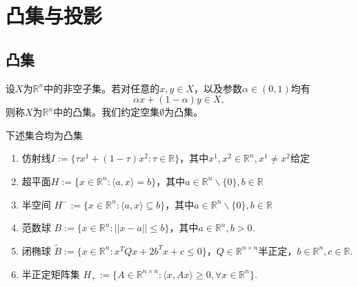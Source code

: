 \chapter{凸集与投影}\label{chap:convexSet}
\section{凸集}
\begin{definition}[凸集]
    设$X$为$\mathbb{R}^n$中的非空子集。若对任意的$x,y\in X$，以及参数$\alpha\in(0,1)$均有
    \begin{equation}\label{eq:convexSetDefinition}
        \alpha x + (1-\alpha)y\in X,
    \end{equation}
    则称$X$为$\mathbb{R}^n$中的凸集。我们约定空集$\emptyset$为凸集。
\end{definition}
\begin{example}
    下述集合均为凸集
    \begin{enumerate}
        \item 仿射线$I:=\{\tau x^{1}+(1-\tau)x^{2}:\tau\in\mathbb{R}\}$，其中$x^{1},x^{2}\in\mathbb{R}^{n},x^{1}\neq x^{2}$给定
        \item 超平面$H:=\{x\in\mathbb{R}^{n}:\langle a,x\rangle=b\}$，其中$a\in\mathbb{R}^{n}\backslash\{0\},b\in\mathbb{R}$
        \item 半空间 $H^{-}:=\{x\in\mathbb{R}^{n}:\langle a,x\rangle\subseteq b\}$，其中$a\in\mathbb{R}^{n}\backslash\{0\},b\in\mathbb{R}$
        \item 范数球 $B:=\{x\in\mathbb{R}^{n}:||x-a||\leq b\}$，其中$a\in\mathbb{R}^{n},b> 0.$
        \item 闭椭球 ${\tilde{B}}:=\{x\in\mathbb{R}^{n}:x^{T}Q x+2b^{T}x+c\leq0\}$，$Q\in\mathbb{R}^{n\times n}$半正定，$b\in\mathbb{R}^{n},c\in\mathbb{R}.$
        \item 半正定矩阵集 $H_{+}:=\{A\in\mathbb{R}^{n\times n}:\langle x,A x\rangle\geq0,\forall x\in\mathbb{R}^{n}\}.$
    \end{enumerate}
\end{example}

